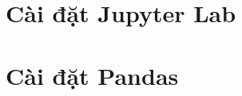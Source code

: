 \documentclass[
]{book}
\begin{document}
\hypertarget{cuxe0i-ux111ux1eb7t-jupyter-lab}{%
\section*{Cài đặt Jupyter Lab}\label{cuxe0i-ux111ux1eb7t-jupyter-lab}}

\hypertarget{cuxe0i-ux111ux1eb7t-pandas}{%
\section*{Cài đặt Pandas}\label{cuxe0i-ux111ux1eb7t-pandas}}

  
\end{document}
